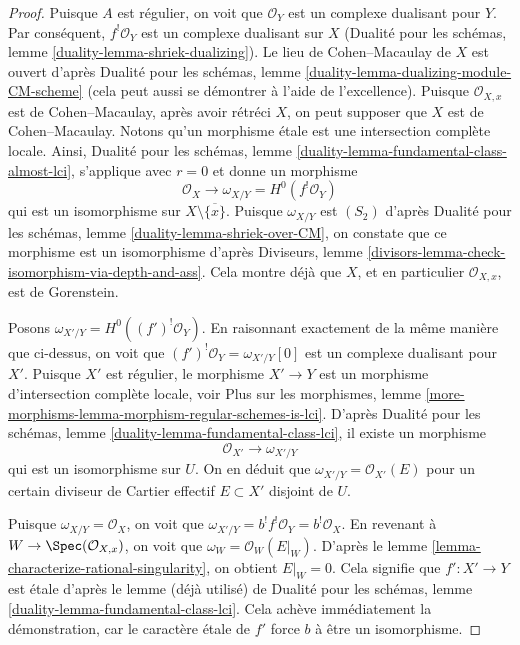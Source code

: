 \begin{proof}
\medskip\noindent
Puisque $A$ est régulier, on voit que $\mathcal{O}_Y$ est un complexe dualisant pour $Y$.
Par conséquent, $f^!\mathcal{O}_Y$ est un complexe dualisant sur $X$
(Dualité pour les schémas, lemme \ref{duality-lemma-shriek-dualizing}).
Le lieu de Cohen--Macaulay de $X$ est ouvert d'après
Dualité pour les schémas, lemme \ref{duality-lemma-dualizing-module-CM-scheme}
(cela peut aussi se démontrer à l'aide de l'excellence).
Puisque $\mathcal{O}_{X, x}$ est de Cohen--Macaulay, après avoir rétréci
$X$, on peut supposer que $X$ est de Cohen--Macaulay.
Notons qu'un morphisme \'etale est une intersection complète locale.
Ainsi,
Dualité pour les schémas, lemme \ref{duality-lemma-fundamental-class-almost-lci},
s'applique avec $r = 0$ et donne un morphisme
$$
\mathcal{O}_X \longrightarrow \omega_{X/Y} = H^0(f^!\mathcal{O}_Y)
$$
qui est un isomorphisme sur $X \setminus \overline{\{x\}}$.
Puisque $\omega_{X/Y}$ est $(S_2)$ d'après
Dualité pour les schémas, lemme \ref{duality-lemma-shriek-over-CM},
on constate que ce morphisme est un isomorphisme d'après
Diviseurs, lemme \ref{divisors-lemma-check-isomorphism-via-depth-and-ass}.
Cela montre déjà que $X$, et en particulier $\mathcal{O}_{X, x}$, est
de Gorenstein.

\medskip\noindent
Posons $\omega_{X'/Y} = H^0((f')^!\mathcal{O}_Y)$. En raisonnant exactement de la
même manière que ci-dessus, on voit que $(f')^!\mathcal{O}_Y = \omega_{X'/Y}[0]$
est un complexe dualisant pour $X'$. Puisque $X'$ est régulier,
le morphisme $X' \to Y$ est un morphisme d'intersection complète locale, voir
Plus sur les morphismes, lemme
\ref{more-morphisms-lemma-morphism-regular-schemes-is-lci}.
D'après Dualité pour les schémas, lemme \ref{duality-lemma-fundamental-class-lci},
il existe un morphisme
$$
\mathcal{O}_{X'} \longrightarrow \omega_{X'/Y}
$$
qui est un isomorphisme sur $U$. On en déduit que
$\omega_{X'/Y} = \mathcal{O}_{X'}(E)$ pour un certain diviseur de
Cartier effectif $E \subset X'$ disjoint de $U$.

\medskip\noindent
Puisque $\omega_{X/Y} = \mathcal{O}_X$, on voit que
$\omega_{X'/Y} = b^! f^!\mathcal{O}_Y = b^!\mathcal{O}_X$.
En revenant à $W \to \Spec(\mathcal{O}_{X, x})$,
on voit que $\omega_W = \mathcal{O}_W(E|_W)$.
D'après le lemme \ref{lemma-characterize-rational-singularity},
on obtient $E|_W = 0$.
Cela signifie que $f' : X' \to Y$ est \'etale d'après le lemme (déjà utilisé)
de Dualité pour les schémas, lemme \ref{duality-lemma-fundamental-class-lci}.
Cela achève immédiatement la démonstration, car le caractère \'etale
de $f'$ force $b$ à être un isomorphisme.
\end{proof}

